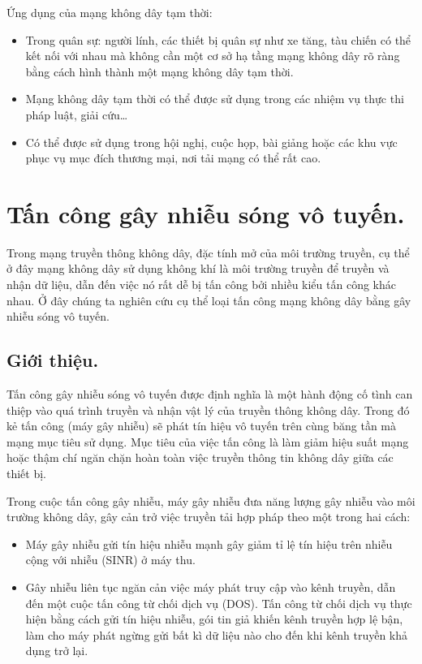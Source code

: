 \documentclass{uetgraduation}
\begin{document}
\begin{itemize}
    Ứng dụng của mạng không dây tạm thời:
    \begin{itemize}
        \item Trong quân sự: người lính, các thiết bị quân sự như xe tăng, tàu chiến có thể kết nối với nhau mà không cần một cơ sở hạ tầng mạng không dây rõ ràng
        bằng cách hình thành một mạng không dây tạm thời.
        \item Mạng không dây tạm thời có thể được sử dụng trong các nhiệm vụ thực thi pháp luật, giải cứu\dots
        \item Có thể được sử dụng trong hội nghị, cuộc họp, bài giảng hoặc các khu vực phục vụ mục đích thương mại, nơi tải mạng có thể rất cao.
    \end{itemize}
\end{itemize}


\section{Tấn công gây nhiễu sóng vô tuyến.}
Trong mạng truyền thông không dây, đặc tính mở của môi trường truyền, cụ thể ở đây mạng không dây sử dụng không khí là môi trường truyền để truyền và nhận dữ
liệu, dẫn đến việc nó rất dễ bị tấn công bởi nhiều kiểu tấn công khác nhau. Ở đây chúng ta nghiên cứu cụ thể loại tấn công mạng không dây bằng gây nhiễu sóng
vô tuyến.

\subsection{Giới thiệu.}
Tấn công gây nhiễu sóng vô tuyến được định nghĩa là một hành động cố tình can thiệp vào quá trình truyền và nhận vật lý của truyền thông
không dây. Trong đó kẻ tấn công (máy gây nhiễu) sẽ phát tín hiệu vô tuyến trên cùng băng tần mà mạng mục tiêu sử dụng. Mục tiêu của việc
tấn công là làm giảm hiệu suất mạng hoặc thậm chí ngăn chặn hoàn toàn việc truyền thông tin không dây giữa các thiết bị.

Trong cuộc tấn công gây nhiễu, máy gây nhiễu đưa năng lượng gây nhiễu vào môi trường không dây, gây cản trở việc truyền tải hợp pháp theo
một trong hai cách: 
\begin{itemize}
    \item Máy gây nhiễu gửi tín hiệu nhiễu mạnh gây giảm tỉ lệ tín hiệu trên nhiễu cộng với nhiễu (SINR) ở máy thu.
    \item Gây nhiễu liên tục ngăn cản việc máy phát truy cập vào kênh truyền, dẫn đến một cuộc tấn công từ chối dịch vụ (DOS). Tấn công từ
    chối dịch vụ thực hiện bằng cách gửi tín hiệu nhiễu, gói tin giả khiến kênh truyền hợp lệ bận, làm cho máy phát ngừng gửi bất kì dữ liệu nào
    cho đến khi kênh truyền khả dụng trở lại.
\end{itemize}
\end{document}
